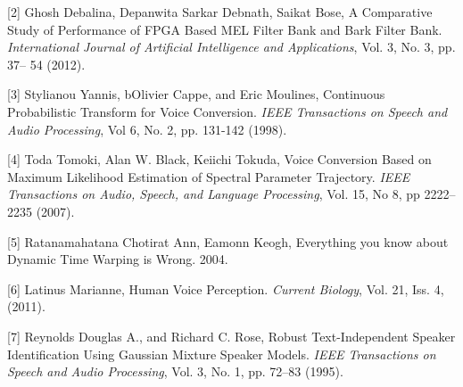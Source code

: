 \documentclass{article}
\begin{document}
[2] Ghosh Debalina,  Depanwita Sarkar Debnath, Saikat Bose, A Comparative Study of Performance of FPGA Based MEL Filter Bank and Bark Filter Bank. {\it International Journal of Artificial Intelligence and Applications}, Vol. 3, No. 3, pp. 37-- 54 (2012). 
 
[3] Stylianou  Yannis,  bOlivier Cappe, and Eric Moulines, Continuous Probabilistic Transform for Voice Conversion. {\it IEEE Transactions on Speech and Audio Processing}, Vol 6, No. 2, pp. 131-142 (1998). 
 
[4] Toda Tomoki, Alan W. Black, Keiichi Tokuda, Voice Conversion Based on Maximum Likelihood Estimation of Spectral Parameter Trajectory. {\it IEEE Transactions on Audio, Speech, and Language Processing}, Vol. 15, No 8, pp 2222--2235 (2007). 
 
[5] Ratanamahatana Chotirat Ann, Eamonn Keogh, Everything you know about Dynamic Time Warping is Wrong. 2004. 
 
[6] Latinus Marianne, Human Voice Perception. {\it Current Biology}, Vol. 21, Iss. 4, (2011). 
 
[7] Reynolds Douglas A., and Richard C. Rose, Robust Text-Independent Speaker Identification Using Gaussian Mixture Speaker Models. {\it IEEE Transactions on Speech and Audio Processing}, Vol. 3, No. 1, pp. 72--83 (1995).
\end{document}
